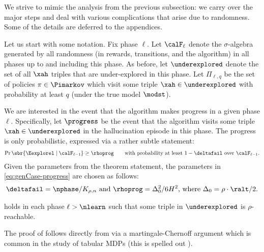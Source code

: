 
We strive to mimic the analysis from the previous subsection: we carry over the major steps and deal with various complications that arise due to randomness. Some of the details are deferred to the appendices.

Let us start with some notation. Fix phase $\ell$. Let $\calF_{\ell}$ denote the $\sigma$-algebra generated by all randomness (in rewards, transitions, and the algorithm) in all phases up to and including this phase.  As before, let $\underexplored$ denote the set of all $\xah$ triples that are under-explored in this phase. Let $\Pi_{\ell,q}$ be the set of policies $\pi\in \Pimarkov$ which visit some triple $\xah\in \underexplored$ with probability at least $q$ (under the true model $\modst$).

We are interested in the event that the algorithm makes progress in a given phase $\ell$. Specifically, let
$\progress$ be the event that the algorithm visits some triple $\xah\in\underexplored$ in the hallucination episode in this phase. The progress is only probabilistic, expressed via a rather subtle statement:
\begin{align}\label{eq:genCase-progress}
\Pr\sbr{\Eexplorel \mid \calF_{\ell-1}} \geq \rhoprog
\qquad\text{with probability at least $1-\deltafail$ over $\calF_{\ell-1}$}.
\end{align}
Given the parameters from the theorem statement, the parameters in \eqref{eq:genCase-progress} are chosen as follows:
\begin{align}\label{eq:genCase-params}
\text{$\deltafail = \nphase/K_{\rho,n}$
and
$\rhoprog=\Delta_0^2/6H^2$, where $\Delta_0 = \rho\cdot\ralt/2$}.
\end{align}


\begin{lemma}[Progress]\label{lem:main_prob_lemma}
 holds in each phase $\ell > \nlearn$ such that some triple in $\underexplored$ is $\rho$-reachable.
\end{lemma}

The proof of  follows directly from  via a martingale-Chernoff argument which is common in the study of tabular MDPs (this is spelled out ).

